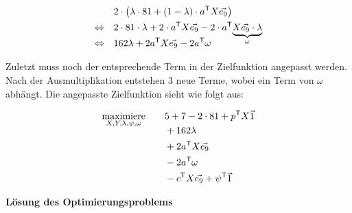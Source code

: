 \begin{align*}
                           & 2 \cdot \left(\lambda\cdot 81 + (1 - \lambda) \cdot a^\mathsf{T}X\vec{e_9}\right)                                                   \\
    \Leftrightarrow  \quad & 2 \cdot 81 \cdot \lambda + 2 \cdot a^\mathsf{T}X\vec{e_9} - 2 \cdot a^\mathsf{T}\smash{\underbrace{X\vec{e_9}\cdot \lambda}_\omega} \\
    \Leftrightarrow  \quad & 162\lambda + 2a^\mathsf{T}X\vec{e_9} - 2a^\mathsf{T}\omega                                                                          \\
\end{align*}
\vspace*{-1.65cm}
\begin{addmargin}[1em]{0em}
    Zuletzt muss noch der entsprechende Term in der Zielfunktion angepasst werden. Nach der Ausmultiplikation entstehen 3 neue Terme, wobei ein Term von $\omega$ abhängt. Die angepasste Zielfunktion sieht wie folgt aus:
\end{addmargin}
\vspace*{-0.4cm}
\begin{align*}
    \smash{\displaystyle{\operatorname*{maximiere}_{X,Y,\lambda,\psi,\omega}}}\qquad & 5 +7 - 2 \cdot 81 + p^\mathsf{T}X\vec{1}          \\
                                                                     & + 162\lambda                                      \\
                                                                     & + 2a^\mathsf{T}X\vec{e_9}                         \\
                                                                     & - 2a^\mathsf{T}\omega                             \\
                                                                     & - c^\mathsf{T}X\vec{e_9} + \psi^\mathsf{T}\vec{1}
\end{align*}
\endgroup


\textbf{Lösung des Optimierungsproblems}

